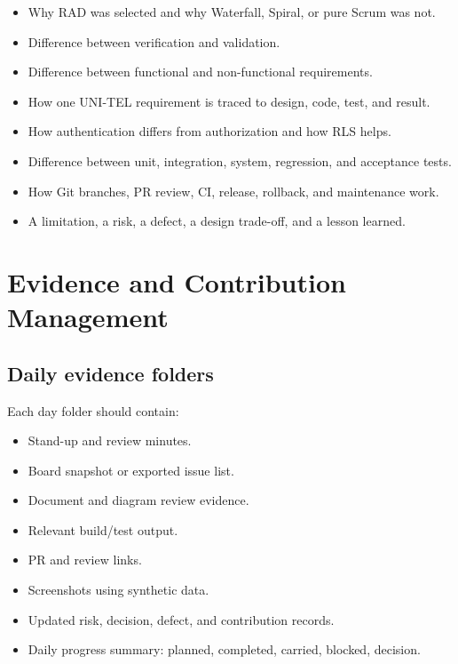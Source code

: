 \documentclass[
  10pt,
  a4paper,
  oneside]{report}
\providecommand{\tightlist}{%
  \setlength{\itemsep}{0pt}\setlength{\parskip}{0pt}}
\begin{document}
\begin{itemize}
\tightlist
\item
  Why RAD was selected and why Waterfall, Spiral, or pure Scrum was not.
\item
  Difference between verification and validation.
\item
  Difference between functional and non-functional requirements.
\item
  How one UNI-TEL requirement is traced to design, code, test, and
  result.
\item
  How authentication differs from authorization and how RLS helps.
\item
  Difference between unit, integration, system, regression, and
  acceptance tests.
\item
  How Git branches, PR review, CI, release, rollback, and maintenance
  work.
\item
  A limitation, a risk, a defect, a design trade-off, and a lesson
  learned.
\end{itemize}

\chapter{Evidence and Contribution
Management}\label{25-evidence-and-contribution-management}

\section{Daily evidence folders}\label{251-daily-evidence-folders}

Each day folder should contain:

\begin{itemize}
\tightlist
\item
  Stand-up and review minutes.
\item
  Board snapshot or exported issue list.
\item
  Document and diagram review evidence.
\item
  Relevant build/test output.
\item
  PR and review links.
\item
  Screenshots using synthetic data.
\item
  Updated risk, decision, defect, and contribution records.
\item
  Daily progress summary: planned, completed, carried, blocked,
  decision.
\end{itemize}
\end{document}
